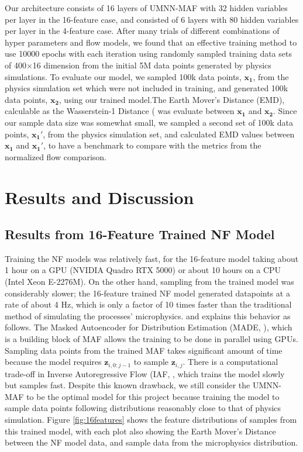 \documentclass[conference]{IEEEtran}
\begin{document}
Our architecture consists of 16 layers of UMNN-MAF with 32 hidden variables per layer in the 16-feature case, and consisted of 6 layers with 80 hidden variables per layer in the 4-feature case. After many trials of different combinations of hyper parameters and flow models, we found that an effective training method to use 10000 epochs with each iteration using randomly sampled training data sets of 400$\times$16 dimension from the initial 5M data points generated by physics simulations. To evaluate our model, we sampled 100k data points, $\mathbf{x_1}$, from the physics simulation set which were not included in training, and generated 100k data points, $\mathbf{x_2}$, using our trained model.The Earth Mover's Distance (EMD), calculable as the Wasserstein-1 Distance (\cite{Dobrushin} was evaluate between $\mathbf{x_1}$ and $\mathbf{x_2}$. Since our sample data size was somewhat small, we sampled a second set of 100k data points, $\mathbf{x_1'}$, from the physics simulation set, and calculated EMD values between  $\mathbf{x_1}$ and $\mathbf{x_1'}$, to have a benchmark to compare with the metrics from the normalized flow comparison.




\section{Results and Discussion}
\subsection{Results from 16-Feature Trained NF Model}
Training the NF models was relatively fast, for the 16-feature model taking about 1 hour on a GPU (NVIDIA Quadro RTX 5000) or about 10 hours on a CPU (Intel Xeon E-2276M). On the other hand, sampling from the trained model was considerably slower; the 16-feature trained NF model generated datapoints at a rate of about 4 Hz, which is only a factor of 10 times faster than the traditional method of simulating the processes' microphysics. \cite{NEURIPS20192a084e55} and \cite{papamakarios2018masked} explains this behavior as follows. The Masked Autoencoder for Distribution Estimation (MADE, \cite{pmlr-v37-germain15}), which is a building block of MAF allows the training to be done in parallel using GPUs. Sampling data points from the trained MAF takes significant amount of time because the model requires $\mathbf{z}_{i,0:j-1}$ to sample $\mathbf{z}_{i,j}$. There is a computational trade-off in Inverse Autoregressive Flow (IAF, \cite{NIPS2016ddeebdee}, which trains the model slowly but samples fast. Despite this known drawback, we still consider the UMNN-MAF to be the optimal model for this project because training the model to sample data points following distributions reasonably close to that of physics simulation. Figure \ref{fig:16features} shows the feature distributions of samples from this trained model, with each plot also showing the Earth Mover's Distance between the NF model data, and sample data from the microphysics distribution.
\end{document}
